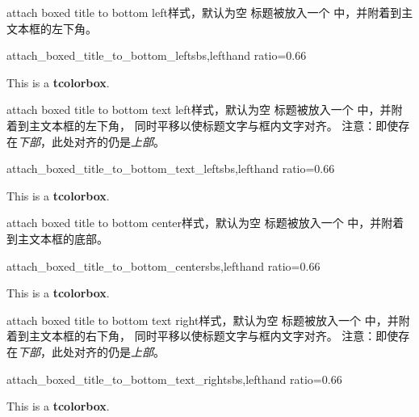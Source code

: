 \clearpage

\begin{docTcbKey}{attach boxed title to bottom left}{}{样式，默认为空}
标题被放入一个  中，并附着到主文本框的左下角。
\begin{exdispExample*}{attach_boxed_title_to_bottom_left}{sbs,lefthand ratio=0.66}
\begin{tcolorbox}[enhanced,title=My title,
  attach boxed title to bottom left]
  This is a \textbf{tcolorbox}.
\end{tcolorbox}
\end{exdispExample*}
\end{docTcbKey}


\begin{docTcbKey}[][doc new=2021-07-30]{attach boxed title to bottom text left}{}{样式，默认为空}
标题被放入一个  中，并附着到主文本框的左下角，
同时平移以使标题文字与框内文字对齐。
注意：即使存在\emph{下部}，此处对齐的仍是\emph{上部}。
\begin{exdispExample*}{attach_boxed_title_to_bottom_text_left}{sbs,lefthand ratio=0.66}
\begin{tcolorbox}[enhanced,title=My title,
  attach boxed title to bottom text left]
  This is a \textbf{tcolorbox}.
\end{tcolorbox}
\end{exdispExample*}
\end{docTcbKey}


\begin{docTcbKey}{attach boxed title to bottom center}{}{样式，默认为空}
标题被放入一个  中，并附着到主文本框的底部。
\begin{exdispExample*}{attach_boxed_title_to_bottom_center}{sbs,lefthand ratio=0.66}
\begin{tcolorbox}[enhanced,title=My title,
  attach boxed title to bottom center]
  This is a \textbf{tcolorbox}.
\end{tcolorbox}
\end{exdispExample*}
\end{docTcbKey}


\begin{docTcbKey}[][doc new=2021-07-30]{attach boxed title to bottom text right}{}{样式，默认为空}
标题被放入一个  中，并附着到主文本框的右下角，
同时平移以使标题文字与框内文字对齐。
注意：即使存在\emph{下部}，此处对齐的仍是\emph{上部}。
\begin{exdispExample*}{attach_boxed_title_to_bottom_text_right}{sbs,lefthand ratio=0.66}
\begin{tcolorbox}[enhanced,title=My title,
  halign=right,
  attach boxed title to bottom text right]
  This is a \textbf{tcolorbox}.
\end{tcolorbox}
\end{exdispExample*}
\end{docTcbKey}


